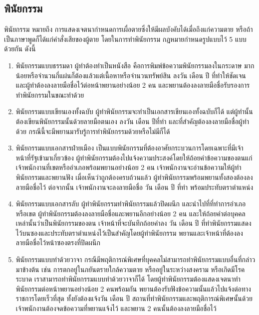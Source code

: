 \documentclass[12pt,oneside,openright,a4paper]{cpe-thai-project}
\begin{document}
\subsection{พินัยกรรม  \cite{will}}
\tab พินัยกรรม หมายถึง การแสดงเจตนากำหนดการเผื่อตายซึ่งให้มีผลบังคับได้เมื่อถึงแก่ความตาย หรือถ้าเป็นภาษาพูดก็ได้แก่คำสั่งเสียของผู้ตาย โดยในการทำพินัยกรรม กฎหมายกำหนดรูปแบบไว้ 5 แบบด้วยกัน ดังนี้
\begin{enumerate}[label=\thesubsection.\arabic*,leftmargin=0pt,itemindent=2.5cm]
\item พินัยกรรมแบบธรรมดา ผู้ทำต้องทำเป็นหนังสือ คือการพิมพ์ข้อความพินัยกรรมลงในกระดาษ มากน้อยหรือจำนวนกี่แผ่นก็ต้องแล้วแต่เนื้อหาหรือจำนวนทรัพย์สิน   ลงวัน เดือน ปี ที่ทำให้ชัดเจน และผู้ทำต้องลงลายมือชื่อไว้ต่อหน้าพยานอย่างน้อย 2 คน และพยานต้องลงลายมือชื่อรับรองการทำพินัยกรรมในขณะทำด้วย
\item พินัยกรรมแบบเขียนเองทั้งฉบับ ผู้ทำพินัยกรรมจะทำเป็นเอกสารเขียนเองทั้งฉบับก็ได้ แต่ผู้ทำนั้นต้องเขียนพินัยกรรมนั้นด้วยลายมือตนเอง   ลงวัน เดือน ปีที่ทำ และที่สำคัญต้องลงลายมือชื่อผู้ทำด้วย กรณีนี้จะมีพยานมารับรู้การทำพินัยกรรมด้วยหรือไม่มีก็ได้
\item พินัยกรรมแบบเอกสารฝ่ายเมือง เป็นแบบพินัยกรรมที่ต้องอาศัยกระบวนการโดยเฉพาะที่มีเจ้าหน้าที่รัฐเข้ามาเกี่ยวข้อง   ผู้ทำพินัยกรรมต้องไปแจ้งความประสงค์โดยให้ถ้อยคำข้อความของตนแก่เจ้าพนักงานที่เขตหรืออำเภอพร้อมพยานอย่างน้อย 2 คน   เจ้าพนักงานจะอ่านข้อความให้ผู้ทำพินัยกรรมและพยานฟัง เมื่อเห็นว่าถูกต้องครบถ้วนแล้ว ผู้ทำพินัยกรรมพร้อมพยานทั้งสองต้องลงลายมือชื่อไว้   ต่อจากนั้น เจ้าพนักงานจะลงลายมือชื่อ วัน เดือน ปี ที่ทำ พร้อมประทับตราตำแหน่ง
\item พินัยกรรมแบบเอกสารลับ ผู้ทำพินัยกรรมทำพินัยกรรมแล้วปิดผนึก และนำไปที่ที่ทำการอำเภอหรือเขต   ผู้ทำพินัยกรรมต้องลงลายมือชื่อและพยานอีกอย่างน้อย 2 คน และให้ถ้อยคำต่อบุคคลเหล่านั้นว่าเป็นพินัยกรรมของตน   เจ้าหน้าที่จะบันทึกถ้อยคำลง วัน เดือน ปี ที่ทำพินัยกรรมแสดงไว้บนซองและประทับตราตำแหน่งไว้เป็นสำคัญโดยผู้ทำพินัยกรรม   พยานและเจ้าหน้าที่ต้องลงลายมือชื่อไว้หน้าซองตรงที่ปิดผนึก
\item พินัยกรรมแบบทำด้วยวาจา กรณีมีพฤติการณ์พิเศษที่บุคคลไม่สามารถทำพินัยกรรมแบบอื่นที่กล่าวมาข้างต้น เช่น การตกอยู่ในภยันตรายใกล้ความตาย หรืออยู่ในระหว่างสงคราม หรือเกิดมีโรคระบาด   เราสามารถทำพินัยกรรมแบบทำด้วยวาจาก็ได้ โดยผู้ทำพินัยกรรมต้องแสดงเจตนาทำพินัยกรรมต่อหน้าพยานอย่างน้อย 2 คนพร้อมกัน   พยานต้องรับฟังข้อความนั้นแล้วไปแจ้งต่อทางราชการโดยเร็วที่สุด ทั้งยังต้องแจ้งวัน เดือน ปี สถานที่ทำพินัยกรรมและพฤติการณ์พิเศษนั้นด้วย   เจ้าพนักงานต้องจดข้อความที่พยานแจ้งไว้ และพยาน 2 คนนั้นต้องลงลายมือชื่อไว้
\end{enumerate}
\end{document}
